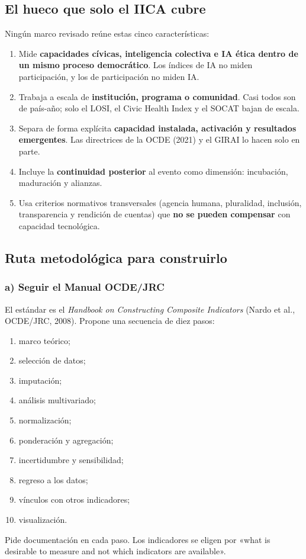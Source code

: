 \documentclass[11pt,a4paper]{article}
\begin{document}
\subsection{El hueco que solo el IICA cubre}

Ningún marco revisado reúne estas cinco características:
\begin{enumerate}
  \item Mide \textbf{capacidades cívicas, inteligencia colectiva e IA ética dentro de un mismo proceso democrático}. Los índices de IA no miden participación, y los de participación no miden IA.
  \item Trabaja a escala de \textbf{institución, programa o comunidad}. Casi todos son de país-año; solo el LOSI, el Civic Health Index y el SOCAT bajan de escala.
  \item Separa de forma explícita \textbf{capacidad instalada, activación y resultados emergentes}. Las directrices de la OCDE (2021) y el GIRAI lo hacen solo en parte.
  \item Incluye la \textbf{continuidad posterior} al evento como dimensión: incubación, maduración y alianzas.
  \item Usa criterios normativos transversales (agencia humana, pluralidad, inclusión, transparencia y rendición de cuentas) que \textbf{no se pueden compensar} con capacidad tecnológica.
\end{enumerate}

\subsection{Ruta metodológica para construirlo}

\subsubsection*{a) Seguir el Manual OCDE/JRC}
El estándar es el \emph{Handbook on Constructing Composite Indicators} (Nardo et al., OCDE/JRC, 2008). Propone una secuencia de diez pasos:
\begin{enumerate}
  \item marco teórico;
  \item selección de datos;
  \item imputación;
  \item análisis multivariado;
  \item normalización;
  \item ponderación y agregación;
  \item incertidumbre y sensibilidad;
  \item regreso a los datos;
  \item vínculos con otros indicadores;
  \item visualización.
\end{enumerate}
Pide documentación en cada paso. Los indicadores se eligen por «what is desirable to measure and not which indicators are available».
\end{document}
